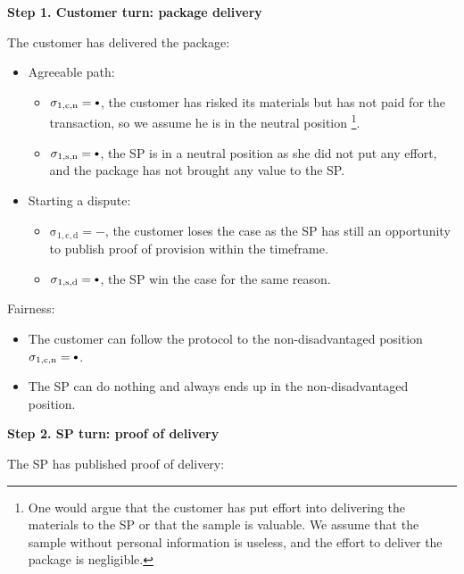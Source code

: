 \documentclass{ieeeaccess}
\newcommand\sbullet[1][.75]{\mathbin{\ThisStyle{\vcenter{\hbox{%
  \scalebox{#1}{$\SavedStyle\bullet$}}}}}%
}
\begin{document}
\noindent \textbf
{Step 1. Customer turn: package delivery}\label{step-1-deliver-package}

The customer has delivered the package:

\begin{itemize}
\item Agreeable path:
  \begin{itemize}
  \item
    \(\operatorname{\sigma_{1, c, n} = \sbullet}\), the customer has risked its materials but has not paid for the transaction, so we assume he is in the neutral position \footnote{One would argue that the customer has put effort into delivering the materials to the SP or that the sample is valuable. We assume that the sample without personal information is useless, and the effort to deliver the package is negligible.}.
  \item
    \(\operatorname{\sigma_{1, s, n} = \sbullet}\), the SP is in a neutral position as she did not put any effort, and the package has not brought any value to the SP.
  \end{itemize}
\item
  Starting a dispute:

  \begin{itemize}
  
  \item
    \(\operatorname{\sigma_{1, c, d} = -}\), the customer loses the case as the SP has still an opportunity to publish proof of provision within the timeframe.
  \item
    \(\operatorname{\sigma_{1, s, d} = \sbullet}\), the SP win the case for the same reason.
  \end{itemize}
\end{itemize}

Fairness:

\begin{itemize}

\item
  The customer can follow the protocol to the non-disadvantaged position \(\operatorname{\sigma_{1, c, n} = \sbullet}\).
\item
  The SP can do nothing and always ends up in the non-disadvantaged position.
\end{itemize}

\noindent \textbf
{Step 2. SP turn: proof of delivery}\label{step-2-proof-of-delivery}

The SP has published proof of delivery:
\end{document}
